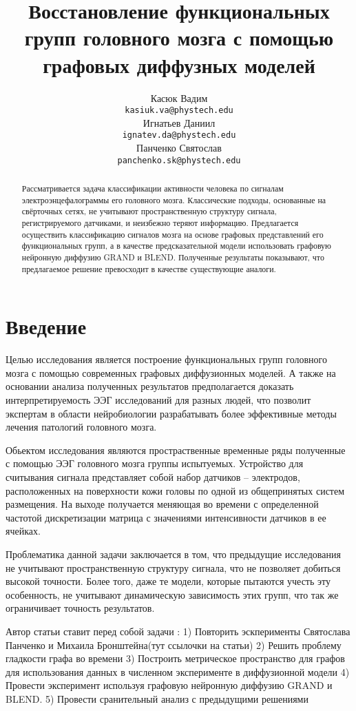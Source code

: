 \documentclass{article}
\title{Восстановление функциональных групп головного мозга с помощью графовых диффузных моделей}
\author{
	Касюк Вадим \\
	\texttt{kasiuk.va@phystech.edu} \\
	\And
	Игнатьев Даниил \\
	\texttt{ignatev.da@phystech.edu} \\
	\And
	Панченко Святослав \\
	\texttt{panchenko.sk@phystech.edu}
}
\date{}
\begin{document}
\maketitle

\begin{abstract}
Рассматривается задача классификации активности человека по сигналам электроэнцефалограммы его головного мозга. Классические подходы, основанные на свёрточных сетях, не учитывают пространственную структуру сигнала, регистрируемого датчиками, и неизбежно теряют информацию. Предлагается осуществить классификацию сигналов мозга на основе графовых представлений его функциональных групп, а в качестве предсказательной модели использовать графовую нейронную диффузию GRAND и BLEND. Полученные результаты показывают, что предлагаемое решение превосходит в качестве существующие аналоги.

\end{abstract}



\section{Введение}

Целью исследования является построение функциональных групп головного мозга с помощью современных графовых диффузионных моделей. А также на основании анализа полученных результатов предполагается доказать интерпретируемость ЭЭГ исследований для разных людей, что позволит экспертам в области нейробиологии разрабатывать более эффективные методы лечения патологий головного мозга.

Обьектом исследования являются простраственные временные ряды полученные с помощью ЭЭГ головного мозга группы испытуемых. Устройство для считывания сигнала представляет собой
набор датчиков – электродов, расположенных на поверхности кожи головы по одной
из общепринятых систем размещения. На выходе получается меняющая во времени с определенной частотой дискретизации матрица с значениями интенсивности датчиков в ее ячейках.

Проблематика данной задачи заключается в том, что предыдущие исследования не учитывают пространственную структуру сигнала, что не позволяет добиться высокой точности. Более того, даже те модели, которые пытаются учесть эту особенность, не учитывают динамическую зависимость этих групп, что так же ограничивает точность результатов.

Автор статьи ставит перед собой задачи : 1) Повторить эскперименты Святослава Панченко и Михаила Бронштейна(тут ссылочки на статьи)
2) Решить проблему гладкости графа во времени 
3) Построить метрическое пространство для графов для использования данных в численном эксперименте в диффузионной модели
4) Провести эксперимент используя графовую нейронную диффузию GRAND и
BLEND.
5) Провести сранительный анализ с предыдущими решениями




%
\end{document}
